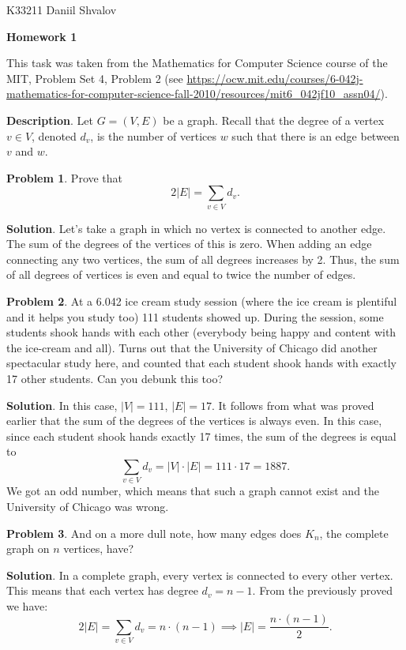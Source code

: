 \documentclass[a4paper, 14pt]{extarticle}
\begin{document}
\begin{flushright}
  K33211 Daniil Shvalov
\end{flushright}

\begin{center}
  \textbf{Homework 1}
\end{center}

This task was taken from the Mathematics for Computer Science course of the MIT,
Problem Set 4, Problem 2 (see
\href{https://ocw.mit.edu/courses/6-042j-mathematics-for-computer-science-fall-2010/resources/mit6_042jf10_assn04/}{https://ocw.mit.edu/courses/6-042j-mathematics-for-computer-science-fall-2010/resources/mit6\_042jf10\_assn04/}).

\textbf{Description}. Let \(G = (V, E)\) be a graph. Recall that the degree of a
vertex \(v \in V\), denoted \(d_v\), is the number of vertices \(w\) such that
there is an edge between \(v\) and \(w\).

\textbf{Problem 1}. Prove that
\[
  2|E| = \sum_{v \in V} d_v.
\]

\textbf{Solution}. Let's take a graph in which no vertex is connected to another
edge. The sum of the degrees of the vertices of this is zero. When adding an
edge connecting any two vertices, the sum of all degrees increases by 2. Thus,
the sum of all degrees of vertices is even and equal to twice the number of
edges.

\textbf{Problem 2}. At a 6.042 ice cream study session (where the ice cream is
plentiful and it helps you study too) 111 students showed up. During the
session, some students shook hands with each other (everybody being happy and
content with the ice-cream and all). Turns out that the University of Chicago
did another spectacular study here, and counted that each student shook hands
with exactly 17 other students. Can you debunk this too?

\textbf{Solution}. In this case, \(|V| = 111\), \(|E| = 17\). It follows from what
was proved earlier that the sum of the degrees of the vertices is always even.
In this case, since each student shook hands exactly 17 times, the sum of the
degrees is equal to
\[
  \sum_{v \in V} d_v = |V| \cdot |E| = 111 \cdot 17 = 1887.
\]
We got an odd number, which means that such a graph cannot exist and the
University of Chicago was wrong.

\textbf{Problem 3}. And on a more dull note, how many edges does \(K_n\), the
complete graph on \(n\) vertices, have?

\textbf{Solution}. In a complete graph, every vertex is connected to every other
vertex. This means that each vertex has degree \(d_v = n - 1\). From the
previously proved we have:
\[
  2 |E| = \sum_{v \in V} d_v = n \cdot (n - 1)
  \implies
  |E| = \frac{n \cdot (n - 1)}{2}.
\]
\end{document}
